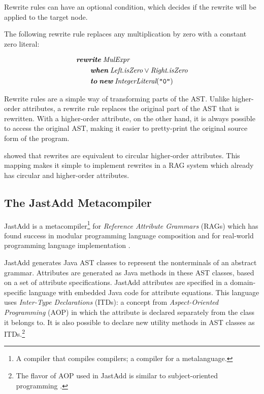 \documentclass[10pt, twoside, openright]{book}
\begin{document}
Rewrite rules can have an optional condition, which decides if the rewrite will be applied
to the target node.

The following rewrite rule replaces any multiplication by zero with a constant zero literal:


\begin{align*}
& \textit{\textbf{rewrite}} \; \textit{MulExpr} \\
& \qquad \textit{\textbf{when}} \; \textit{Left}.\textit{isZero} \lor \textit{Right}.\textit{isZero} \\
& \qquad \textit{\textbf{to}} \; \textit{\textbf{new}} \; \textit{IntegerLiteral}(\texttt{"0"})
\end{align*}

Rewrite rules are a simple way of transforming parts of the AST.
Unlike higher-order attributes, a rewrite rule replaces the original part of the AST that is
rewritten. With a higher-order attribute, on the other hand, it is always possible to access the original AST,
making it easier to pretty-print the original source form of the program.

\textcite{DBLP:journals/cl/SoderbergH15} showed that rewrites are equivalent to circular higher-order
attributes. This mapping makes it simple to implement rewrites
in a RAG system which already has circular and higher-order attributes.


\subsection{The JastAdd Metacompiler}
\label{sec:jastadd}

JastAdd is a metacompiler\footnote{A compiler that compiles compilers; a compiler for a metalanguage.}
for \emph{Reference Attribute Grammars} (RAGs) which has found success in
modular programming language composition and for real-world programming language implementation
\cite{DBLP:journals/scp/HedinM03,Hedin2011,DBLP:journals/scp/EkmanH07}.

JastAdd generates Java AST classes to represent the nonterminals of an abstract grammar.
Attributes are generated as Java methods in these AST classes,
based on a set of attribute specifications.
JastAdd attributes are specified in a domain-specific language with embedded Java
code for attribute equations. This language uses \emph{Inter-Type Declarations} (ITDs):
a concept from \emph{Aspect-Oriented Programming} (AOP) in which the attribute is declared
separately from the class it belongs to. It is also possible to declare new utility methods in
AST classes as ITDs.\footnote{The flavor of AOP used in JastAdd is similar to subject-oriented
programming \cite{DBLP:conf/oopsla/HarrisonO93}.}
\end{document}
